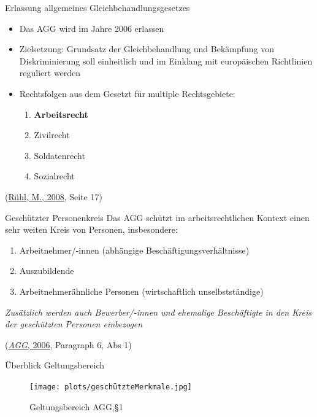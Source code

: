 \documentclass[
  10pt,
  ngerman,
  ignorenonframetext,
]{beamer}
\providecommand{\tightlist}{%
  \setlength{\itemsep}{0pt}\setlength{\parskip}{0pt}}
\begin{document}
\begin{frame}{Erlassung allgemeines Gleichbehandlungsgesetzes}
\protect\hypertarget{erlassung-allgemeines-gleichbehandlungsgesetzes}{}
\begin{itemize}
\item
  Das AGG wird im Jahre 2006 erlassen
\item
  Zielsetzung: Grundsatz der Gleichbehandlung und Bekämpfung von
  Diskriminierung soll einheitlich und im Einklang mit europäischen
  Richtlinien reguliert werden
\item
  Rechtsfolgen aus dem Gesetzt für multiple Rechtsgebiete:

  \begin{enumerate}
  \tightlist
  \item
    \textbf{Arbeitsrecht}
  \item
    Zivilrecht
  \item
    Soldatenrecht
  \item
    Sozialrecht
  \end{enumerate}
\end{itemize}

(\protect\hyperlink{ref-main}{Rühl, M., 2008}, Seite 17)
\end{frame}

\begin{frame}{Geschützter Personenkreis}
\protect\hypertarget{geschuxfctzter-personenkreis}{}
Das AGG schützt im arbeitsrechtlichen Kontext einen sehr weiten Kreis
von Personen, insbesondere:

\begin{enumerate}
\tightlist
\item
  Arbeitnehmer/-innen (abhängige Beschäftigungsverhältnisse)
\item
  Auszubildende
\item
  Arbeitnehmerähnliche Personen (wirtschaftlich unselbstständige)
\end{enumerate}

\emph{Zusätzlich werden auch Bewerber/-innen und ehemalige Beschäftigte
in den Kreis der geschützten Personen einbezogen}

(\protect\hyperlink{ref-agg}{\emph{AGG}, 2006}, Paragraph 6, Abs 1)
\end{frame}

\begin{frame}{Überblick Geltungsbereich}
\protect\hypertarget{uxfcberblick-geltungsbereich}{}
\begin{figure}
\centering
\texttt{[image: plots/geschützteMerkmale.jpg]}
\caption{Geltungsbereich AGG,§1}
\end{figure}
\end{frame}
\end{document}
